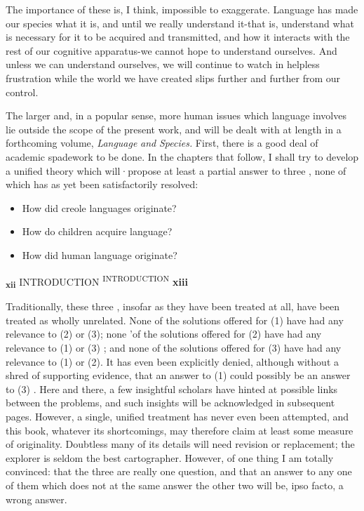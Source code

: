 The importance of these  is, I think, impossible to exaggerate. Language has made our species what it is, and until we really understand it-that is, understand what is necessary for it to be acquired and transmitted, and how it interacts with the rest of our cognitive apparatus-we cannot hope to understand ourselves. And unless we can understand ourselves, we will continue to watch in helpless frustration while the world we have created slips further and further from our control.

The larger and, in a popular sense, more human issues which language involves lie outside the scope of the present work, and will be dealt with at length in a forthcoming volume, \textit{Language} \textit{and} \textit{Species.} First, there is a good deal of academic spadework to be done. In the chapters that follow, I shall try to develop a unified theory which will·propose at least a partial answer to three , none of which has as yet been satisfactorily resolved:


\begin{itemize}
\item How did creole languages originate?
\item How do children acquire language?
\item How did human language originate?
\end{itemize}


\textbf{\textsubscript{xii }}INTRODUCTION \textsuperscript{INTRODUCTION} \textbf{xiii}

Traditionally, these three , insofar as they have been treated at all, have been treated as wholly unrelated. None of the solutions offered for (1) have had any relevance to (2) or (3); none 'of the solu\-tions offered for (2) have had any relevance to (1) or (3) ; and none of the solutions offered for (3) have had any relevance to (1) or (2). It has even been explicitly denied, although without a shred of support\-ing evidence, that an answer to (1) could possibly be an answer to (3) \citep{Sankoff1979}. Here and there, a few insightful scholars have hinted at possible links between the problems, and such insights will be ac\-knowledged in subsequent pages. However, a single, unified treatment has never even been attempted, and this book, whatever its short\-comings, may therefore claim at least some measure of originality. Doubtless many of its details will need revision or replacement; the explorer is seldom the best cartographer. However, of one thing I am totally convinced: that the three  are really one question, and that an answer to any one of them which does not at the same  answer the other two will be, ipso facto, a wrong answer.


